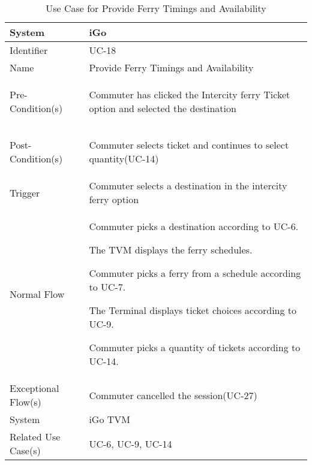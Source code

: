 \begin{table}[ht]
    \centering
    \begin{tabular}{|l|p{11cm}|}
        \hline
        System             & iGo\\
        \hline
        Identifier         & UC-18 \\
        \hline
        Name               & Provide Ferry Timings and Availability \\
        \hline
        Pre-Condition(s)   & 
        \begin{enumerate*}[itemjoin=\newline]
            \item Commuter has clicked the Intercity ferry Ticket option and selected the destination
        \end{enumerate*} \\
        \hline
        Post-Condition(s)  & 
        \begin{enumerate*}[itemjoin=\newline]
            \item Commuter selects ticket and continues to select quantity(UC-14)
        \end{enumerate*} \\
        \hline
        Trigger            & Commuter selects a destination in the intercity ferry option \\
        \hline
        Normal Flow        & 
        \begin{enumerate*}[itemjoin=\newline]
           \item Commuter picks a destination according to UC-6.
            \item The TVM displays the ferry schedules.
            \item Commuter picks a ferry from a schedule according to UC-7.
            \item The Terminal displays ticket choices according to UC-9.
            \item Commuter picks a quantity of tickets according to UC-14.
        \end{enumerate*} \\
        \hline
        Exceptional Flow(s) & Commuter cancelled the session(UC-27) \\
        \hline
        System   &  iGo TVM \\
        \hline
        Related Use Case(s)&  UC-6, UC-9, UC-14\\
        \hline
    \end{tabular}
    \caption{Use Case for Provide Ferry Timings and Availability}
    \label{tab:UC_ProvideFerryTimingsAvailability}
\end{table}

